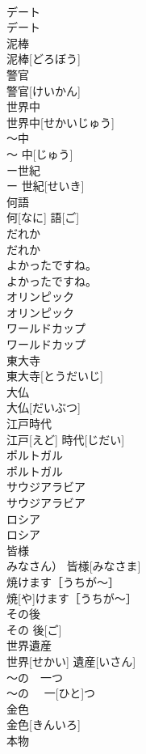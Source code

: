 \documentclass[8pt]{extreport}
\begin{document}
\begin{CJK}{UTF8}{min}
\\	デート	
\\	デート	
\\	泥棒	
\\	泥棒[どろぼう]	
\\	警官	
\\	警官[けいかん]	
\\	世界中	
\\	世界中[せかいじゅう]	
\\	〜中	
\\	〜 中[じゅう]	
\\	ー世紀	
\\	ー 世紀[せいき]	
\\	何語	
\\	何[なに] 語[ご]	
\\	だれか	
\\	だれか	
\\	よかったですね。	
\\	よかったですね。	
\\	オリンピック	
\\	オリンピック	
\\	ワールドカップ	
\\	ワールドカップ	
\\	東大寺	
\\	東大寺[とうだいじ]	
\\	大仏	
\\	大仏[だいぶつ]	
\\	江戸時代	
\\	江戸[えど] 時代[じだい]	
\\	ポルトガル	
\\	ポルトガル	
\\	サウジアラビア	
\\	サウジアラビア	
\\	ロシア	
\\	ロシア	
\\	皆様	
\\	みなさん）	皆様[みなさま]	
\\	焼けます［うちが〜］	
\\	焼[や]けます［うちが〜］	
\\	その後	
\\	その 後[ご]	
\\	世界遺産	
\\	世界[せかい] 遺産[いさん]	
\\	〜の　一つ	
\\	〜の　 一[ひと]つ	
\\	金色	
\\	金色[きんいろ]	
\\	本物	

\end{CJK}
\end{document}
